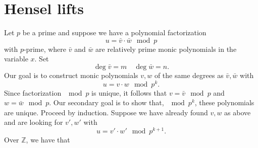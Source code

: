 \documentclass{article}
\begin{document}
\section{Hensel lifts}
Let $p$ be a prime and suppose we have a polynomial factorization
\[
u = \bar v \cdot \bar w \mod p
\] with \(p\)-prime, where \(\bar v\) and \(\bar w\) are relatively prime monic polynomials in the variable \(x\). Set 
\[
\deg \bar v = m\quad \deg \bar  w = n.
\] 
Our goal is to construct monic polynomials \(v, w\) of the same degrees as \(\bar v,\bar  w\) with 
\[
u = v \cdot w \mod p^k.
\]
Since factorization $\mod p$ is unique, it follows that \(v =  \bar v \mod p \) and \(w = \bar w \mod p\). Our secondary goal is to show that, \(\mod p^{k}\), these polynomials are unique. Proceed by induction. Suppose we have already found \(v, w\) as above and are looking for \(v', w'\) with 
\[
u = v'\cdot w' \mod p^{k+1}.
\]
Over $\mathbb Z$, we have that
\end{document}
